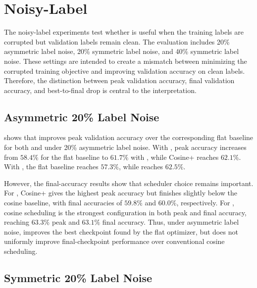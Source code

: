\section{Noisy-Label \cifar{}}
\label{sec:results-cifar-noisy}

The noisy-label \cifar{} experiments test whether \method{} is useful when the training labels are corrupted but validation labels remain clean. The evaluation includes 20\% asymmetric label noise, 20\% symmetric label noise, and 40\% symmetric label noise. These settings are intended to create a mismatch between minimizing the corrupted training objective and improving validation accuracy on clean labels. Therefore, the distinction between peak validation accuracy, final validation accuracy, and best-to-final drop is central to the interpretation.

\subsection{Asymmetric 20\% Label Noise}



 shows that \method{} improves peak validation accuracy over the corresponding flat baseline for both \adamw{} and \sgdm{} under 20\% asymmetric label noise. With \adamw{}, peak accuracy increases from $58.4\%$ for the flat baseline to $61.7\%$ with \method{}, while Cosine+\method{} reaches $62.1\%$. With \sgdm{}, the flat baseline reaches $57.3\%$, while \method{} reaches $62.5\%$.

However, the final-accuracy results show that scheduler choice remains important. For \adamw{}, Cosine+\method{} gives the highest peak accuracy but finishes slightly below the cosine baseline, with final accuracies of $59.8\%$ and $60.0\%$, respectively. For \sgdm{}, cosine scheduling is the strongest configuration in both peak and final accuracy, reaching $63.3\%$ peak and $63.1\%$ final accuracy. Thus, under asymmetric label noise, \method{} improves the best checkpoint found by the flat optimizer, but does not uniformly improve final-checkpoint performance over conventional cosine scheduling.

\FloatBarrier
\subsection{Symmetric 20\% Label Noise}



